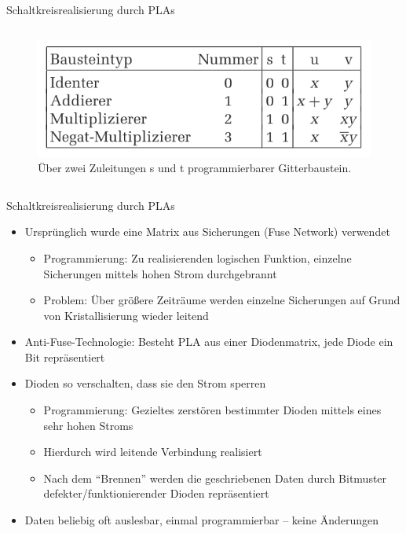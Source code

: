 \documentclass[12pt%
,xcolor=table
,aspectratio=169%
]{beamer}
\begin{document}
\begin{frame}{Schaltkreisrealisierung durch PLAs}
\begin{columns}[T]
\begin{column}{.4\textwidth}
\begin{figure}
\includegraphics[scale=0.2]{pictures/pla2}
\caption{Über zwei Zuleitungen s und t programmierbarer Gitterbaustein.}
\end{figure}
\end{column}%
\end{columns}
\end{frame}

\begin{frame}{Schaltkreisrealisierung durch PLAs}
\begin{itemize}
	\item Ursprünglich wurde eine Matrix aus Sicherungen (Fuse Network) verwendet
	\begin{itemize}
		\item Programmierung: Zu realisierenden logischen Funktion, einzelne Sicherungen mittels hohen Strom durchgebrannt
		\item Problem: Über größere Zeiträume werden einzelne Sicherungen auf Grund von Kristallisierung wieder leitend 
	\end{itemize}
	\item Anti-Fuse-Technologie: Besteht PLA aus einer Diodenmatrix, jede Diode ein Bit repräsentiert
	\item Dioden so verschalten, dass sie den Strom sperren
	\begin{itemize}
		\item Programmierung:  Gezieltes zerstören bestimmter Dioden mittels eines sehr hohen Stroms 
		\item Hierdurch wird leitende Verbindung realisiert
		\item Nach dem \enquote{Brennen} werden die geschriebenen Daten durch Bitmuster defekter/funktionierender Dioden repräsentiert
	\end{itemize}
	\item Daten beliebig oft auslesbar, einmal programmierbar -- keine Änderungen
\end{itemize}
\end{frame}
\end{document}
